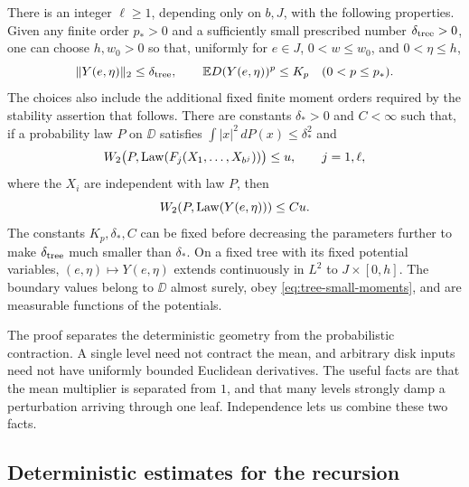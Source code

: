 \begin{proposition}\label{prop:tree-stability}
There is an integer $\ell\ge1$, depending only on $b,J$, with the
following properties.  Given any finite order $p_*>0$ and a sufficiently
small prescribed number $\delta_{\rm tree}>0$, one can choose
$h,w_0>0$ so that, uniformly for $e\in J$, $0<w\le w_0$, and
$0<\eta\le h$,
\begin{equation}\label{eq:tree-small-moments}
 \|Y(e,\eta)\|_2\le\delta_{\rm tree},\qquad
 \mathbb E D(Y(e,\eta))^p\le K_p\quad(0<p\le p_*).
\end{equation}
The choices also include the additional fixed finite moment orders
required by the stability assertion that follows.  There are constants
$\delta_*>0$ and $C<\infty$ such that, if a probability law $P$ on
$\DD$ satisfies $\int|x|^2\,dP(x)\le\delta_*^2$ and
\[
 W_2\bigl(P,\operatorname{Law}(F_j(X_1,\ldots,X_{b^j}))\bigr)\le u,
 \qquad j=1,\ell,
\]
where the $X_i$ are independent with law $P$, then
\begin{equation}\label{eq:tree-law-stability}
 W_2(P,\operatorname{Law}(Y(e,\eta)))\le Cu.
\end{equation}
The constants $K_p,\delta_*,C$ can be fixed before decreasing the
parameters further to make $\delta_{\rm tree}$ much smaller than
$\delta_*$.  On a fixed tree with its fixed potential variables,
$(e,\eta)\mapsto Y(e,\eta)$ extends continuously in $L^2$ to
$J\times[0,h]$.  The boundary values belong to $\DD$ almost surely,
obey \eqref{eq:tree-small-moments}, and are measurable functions of
the potentials.
\end{proposition}

The proof separates the deterministic geometry from the probabilistic
contraction.  A single level need not contract the mean, and arbitrary
disk inputs need not have uniformly bounded Euclidean derivatives.
The useful facts are that the mean multiplier is separated from $1$,
and that many levels strongly damp a perturbation arriving through one
leaf.  Independence lets us combine these two facts.

\subsection{Deterministic estimates for the recursion}

